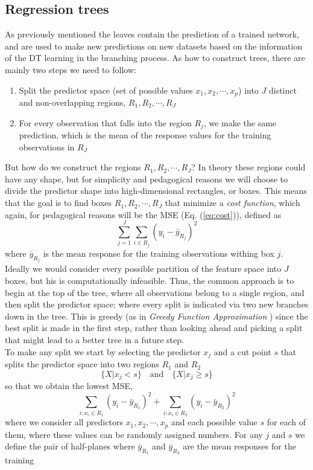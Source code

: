 \documentclass[12pt, a4paper]{book}
\begin{document}
\subsection{Regression trees}
As previously mentioned the leaves contain the prediction of a trained network, and are used to make new predictions on new datasets based on the information of the DT learning in the branching process. As how to construct trees, there are mainly two steps we need to follow:
\begin{enumerate}
    \item Split the predictor space (set of possible values $x_1,x_2,\cdots,x_p$) into $J$ distinct and non-overlapping regions, $R_1,R_2,\cdots,R_J$
    \item For every observation that falls into the region $R_j$, we make the same prediction, which is the mean of the response values for the training observations in $R_J$
\end{enumerate}
But how do we construct the regions $R_1,R_2,\cdots,R_J$? In theory these regions could have any shape, but for simplicity and pedagogical reasons we will choose to divide the predictor shape into high-dimensional rectangles, or boxes. This means that the goal is to find boxes 
$R_1,R_2,\cdots,R_J$ that minimize a \textit{cost function}, which again, for pedagogical reasons will be the MSE (Eq. (\ref{eq:cost})), defined as 
$$
\sum_{j=1}^{J}\sum_{i\in R_j}(y_i -\bar{y}_{R_j})^2
$$
where $\bar{y}_{R_j}$ is the mean response for the training observations withing box $j$. Ideally we would consider every possible partition of the feature space into $J$ boxes, but his is computationally infeasible. Thus, the common approach is to begin at the top of the tree, 
where all observations belong to a single region, and then split the predictor space; where every split is indicated via two new branches down in the tree. This is greedy (as in \textit{Greedy Function Approximation} \cite{BDT_Friedman}) since the best split is made in the first step, 
rather than looking ahead and picking a split that might lead to a better tree in a future step.\\ 
To make any split we start by selecting the predictor $x_j$ and a cut point $s$ that splits the predictor space into two regions $R_1$ and $R_2$
$$
\{X\vert x_j < s\} \quad\text{and}\quad \{X\vert x_j \ge s\}
$$
so that we obtain the lowest MSE, 
$$
\sum_{i:x_i\in R_1}(y_i-\bar{y}_{R_1})^2 + \sum_{i:x_i\in R_2}(y_i-\bar{y}_{R_2})^2
$$
where we consider all predictors $x_1,x_2,\cdots,x_p$ and each possible value $s$ for each of them, where these values can be randomly assigned numbers. For any $j$ and $s$ we define the pair of half-planes where $\bar{y}_{R_1}$ and $\bar{y}_{R_2}$ are the mean responses for the training 
\end{document}
